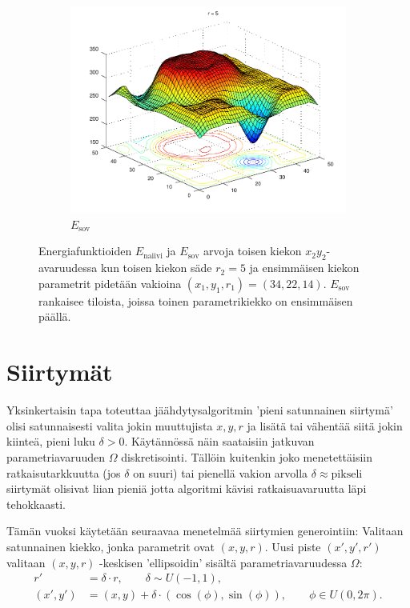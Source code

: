 \begin{figure}[p]
    \begin{subfigure}[b]{0.7\textwidth}
            \includegraphics[width=\textwidth]{figures/localmins4.pdf}
        \caption{$E_\text{sov}$
            \label{fig:localmins4}
        }
    \end{subfigure}
    \caption{Energiafunktioiden $E_\text{naiivi}$ ja $E_\text{sov}$ arvoja toisen kiekon $x_2 y_2$-avaruudessa kun toisen kiekon säde $r_2=5$ ja ensimmäisen kiekon parametrit pidetään vakioina $(x_1, y_1, r_1) = (34, 22, 14)$.
        $E_\text{sov}$ rankaisee tiloista, joissa toinen parametrikiekko on ensimmäisen päällä.
        \label{fig:localmins}}
\end{figure}


\section{Siirtymät}
\label{sec:siirtymat}

Yksinkertaisin tapa toteuttaa jäähdytysalgoritmin 'pieni satunnainen siirtymä' olisi satunnaisesti valita jokin muuttujista $x, y, r$ ja lisätä tai vähentää siitä jokin kiinteä, pieni luku $\delta > 0$.
Käytännössä näin saataisiin jatkuvan parametriavaruuden $\Omega$ diskretisointi.
Tällöin kuitenkin joko menetettäisiin ratkaisutarkkuutta (jos $\delta$ on suuri) tai pienellä vakion arvolla $\delta \approx \text{pikseli}$ siirtymät olisivat liian pieniä jotta algoritmi kävisi ratkaisuavaruutta läpi tehokkaasti.

Tämän vuoksi käytetään seuraavaa menetelmää siirtymien generointiin:
Valitaan satunnainen kiekko, jonka parametrit ovat $(x, y, r)$.
Uusi piste $(x',y',r')$ valitaan $(x, y, r)$ -keskisen 'ellipsoidin' sisältä parametriavaruudessa $\Omega$:
\begin{align}
    r' &= \delta \cdot r, \qquad \delta \sim U(-1, 1),\\
    (x', y') &= (x, y) + \delta \cdot (\cos(\phi), \sin(\phi)), \qquad \phi \in U(0, 2\pi).
\end{align}

